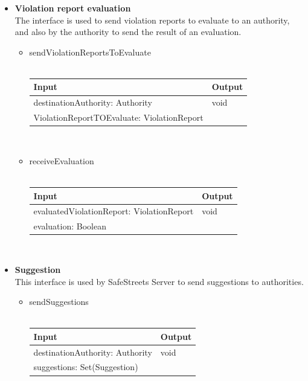 \documentclass{article}
\begin{document}
\begin{itemize}
\begin{itemize}
\begin{tabular}{l | l}
					\end{tabular}\\
				\end{itemize}
			\item \textbf{Violation report evaluation}\\
				The interface is used to send violation reports to evaluate to an authority, and also by the authority to send the result of an evaluation.
				\begin{itemize}
					\item{sendViolationReportsToEvaluate}\\\\
					\begin{tabular}{l | l}
						\textbf{Input} & \textbf{Output}\\
						\hline
						destinationAuthority: Authority & void\\
						ViolationReportTOEvaluate: ViolationReport &\\
					\end{tabular}\\
					\item{receiveEvaluation}\\\\
					\begin{tabular}{l | l}
						\textbf{Input} & \textbf{Output}\\
						\hline
						evaluatedViolationReport: ViolationReport & void\\
						evaluation: Boolean&\\
					\end{tabular}\\
				\end{itemize}
			\item \textbf{Suggestion}\\
			This interface is used by SafeStreets Server to send suggestions to authorities.
				\begin{itemize}
					\item{sendSuggestions}\\\\
					\begin{tabular}{l | l}
						\textbf{Input} & \textbf{Output}\\
						\hline
						destinationAuthority: Authority & void\\
						suggestions: Set(Suggestion)&\\
					\end{tabular}\\
				\end{itemize}

\end{itemize}
\end{document}
